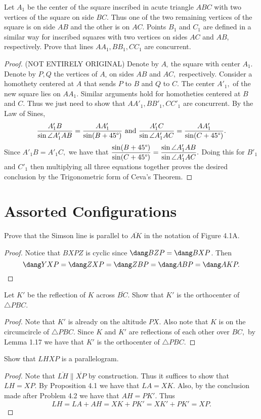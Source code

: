 \documentclass[letterpaper,oneside]{scrartcl}
\providecommand{\ol}{\overline}
\begin{document}
\begin{problem*}
  [3.28, Shortlist 2001/G1]
  Let $A_1$ be the center of the square inscribed in acute triangle $ABC$ with two vertices of the square on side $BC$. Thus one of the two remaining vertices of the square is on side $AB$ and the other is on $AC$. Points $B_1$ and $C_1$ are defined in a similar way for inscribed squares with two vertices on sides $AC$ and $AB$, respectively. Prove that lines $AA_1, BB_1, CC_1$ are concurrent.
\end{problem*}

\begin{proof}
  (NOT ENTIRELY ORIGINAL) Denote by $A_{\square}$ the square with center $A_1$. Denote by $P,Q$ the vertices of $A_{\square}$ on sides $AB$ and $AC,$ respectively. Consider a homothety centered at $A$ that sends $P$ to $B$ and $Q$ to $C.$ The center $A'_1,$ of the new square lies on $AA_1.$ Similar arguments hold for homotheties centered at $B$ and $C.$ Thus we just need to show that $AA'_1, BB'_1, CC'_1$ are concurrent. By the Law of Sines,
  $$\frac{A'_1B}{\sin\angle A'_1AB} = \frac{AA'_1}{\sin(B+45\degree)} \text{ and } \frac{A'_1C}{\sin\angle A'_1AC} = \frac{AA'_1}{\sin(C+45\degree)}.$$
  Since $A'_1B = A'_1C,$ we have that $\displaystyle \frac{\sin(B+45\degree)}{\sin(C+45\degree)} = \frac{\sin\angle A'_1AB}{\sin\angle A'_1AC}.$ Doing this for $B'_1$ and $C'_1$ then multiplying all three equations together proves the desired conclusion by the Trigonometric form of Ceva's Theorem.
\end{proof}
\newpage
\section{Assorted Configurations}
\begin{proposition*}
  [4.1]
  Prove that the Simson line is parallel to $\ol{AK}$ in the notation of Figure 4.1A.
\end{proposition*}
\begin{proof}
  Notice that $BXPZ$ is cyclic since $\dang BZP = \dang BXP$. Then
  $$\dang YXP = \dang ZXP = \dang ZBP  = \dang ABP = \dang AKP.$$
\end{proof}
\begin{problem*}
  [4.2]
  Let $K'$ be the reflection of $K$ across $\ol{BC}$. Show that $K'$ is the orthocenter of $\triangle PBC$.
\end{problem*}
\begin{proof}
  Note that $K'$ is already on the altitude $PX.$ Also note that $K$ is on the circumcircle of $\triangle PBC.$ Since $K$ and $K'$ are reflections of each other over $BC,$ by Lemma 1.17 we have that $K'$ is the orthocenter of $\triangle PBC.$
\end{proof}
\begin{problem*}
  [4.3]
  Show that $LHXP$ is a parallelogram.
\end{problem*}
\begin{proof}
  Note that $\ol{LH} \parallel \ol{XP}$ by construction. Thus it suffices to show that $LH = XP.$ By Proposition 4.1 we have that $LA = XK.$ Also, by the conclusion made after Problem 4.2 we have that $AH = PK'.$ Thus
  $$LH = LA + AH = XK + PK' = XK' + PK' = XP.$$
\end{proof}
\end{document}
